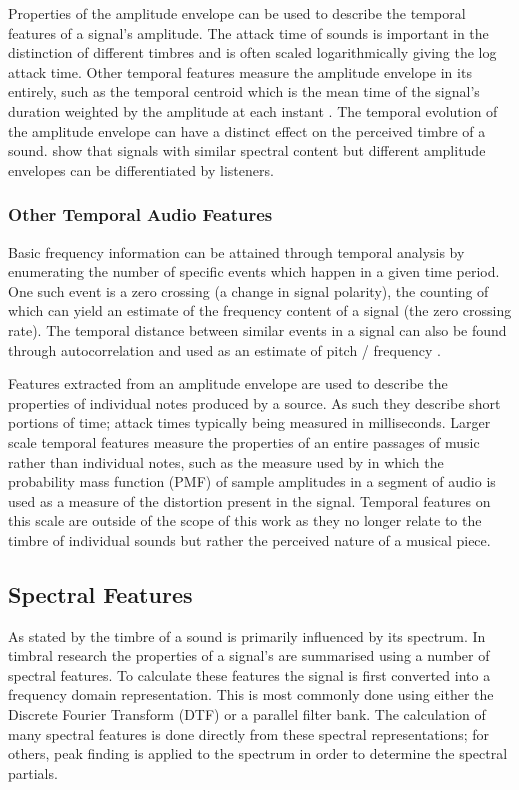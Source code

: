 			Properties of the amplitude envelope can be used to describe the temporal features of a signal's
			amplitude. The attack time of sounds is important in the distinction of different timbres
			\citep{ilmoniemi2004subjective} and is often scaled logarithmically giving the log attack time.
			Other temporal features measure the amplitude envelope in its entirely, such as the temporal
			centroid which is the mean time of the signal's duration weighted by the amplitude at each instant
			\citep{peeters2000instrument}. The temporal evolution of the amplitude envelope can have a distinct
			effect on the perceived timbre of a sound. \citet{patterson1994the} show that signals with similar
			spectral content but different amplitude envelopes can be differentiated by listeners.

		\subsubsection*{Other Temporal Audio Features}
			Basic frequency information can be attained through temporal analysis by enumerating the number of
			specific events which happen in a given time period. One such event is a zero crossing (a change in
			signal polarity), the counting of which can yield an estimate of the frequency content of a signal
			(the zero crossing rate). The temporal distance between similar events in a signal can also be
			found through autocorrelation and used as an estimate of pitch / frequency \citep{mcleod2005a}.

			Features extracted from an amplitude envelope are used to describe the properties of individual
			notes produced by a source. As such they describe short portions of time; attack times typically
			being measured in milliseconds. Larger scale temporal features measure the properties of an entire
			passages of music rather than individual notes, such as the measure used by
			\citet{wilson2014profiling} in which the probability mass function (PMF) of sample amplitudes in a
			segment of audio is used as a measure of the distortion present in the signal.  Temporal features
			on this scale are outside of the scope of this work as they no longer relate to the timbre of
			individual sounds but rather the perceived nature of a musical piece.

	\subsection{Spectral Features}
	\label{sec:Timbre-LowLevelFeatures-Spectral}
		As stated by \cite{ASA1960american} the timbre of a sound is primarily influenced by its spectrum. In
		timbral research the properties of a signal's are summarised using a number of spectral features. To
		calculate these features the signal is first converted into a frequency domain representation. This is most
		commonly done using either the Discrete Fourier Transform (DTF) or a parallel filter bank. The calculation
		of many spectral features is done directly from these spectral representations; for others, peak finding is
		applied to the spectrum in order to determine the spectral partials.

